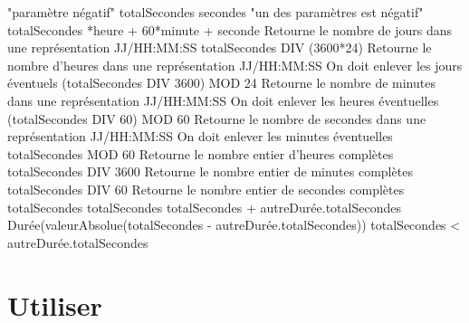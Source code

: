 		\begin{LDA}
					\Stmt {} "paramètre négatif"
				\EndIf
				\Let totalSecondes \Gets secondes
			\EndConstr
		\Empty
					\Stmt {} "un des paramètres est négatif"
				\EndIf
				\Let totalSecondes *heure + 60*minute + seconde
			\EndConstr
		\Empty
			\LComment Retourne le nombre de jours dans une 
			représentation JJ/HH:MM:SS
				\Return totalSecondes DIV (3600*24)
			\EndMethod
		\Empty
			\LComment Retourne le nombre d'heures dans une 
			représentation JJ/HH:MM:SS
				\LComment On doit enlever les jours éventuels
				\Return (totalSecondes DIV 3600) MOD 24
			\EndMethod
		\Empty
			\LComment Retourne le nombre de minutes dans une 
			représentation JJ/HH:MM:SS
				\LComment On doit enlever les heures éventuelles
				\Return (totalSecondes DIV 60) MOD 60
			\EndMethod
		\Empty
			\LComment Retourne le nombre de secondes dans une 
			représentation JJ/HH:MM:SS
				\LComment On doit enlever les minutes éventuelles
				\Return totalSecondes  MOD 60
			\EndMethod
		\Empty
			\LComment Retourne le nombre entier d’heures complètes
				\Return totalSecondes DIV 3600
			\EndMethod
		\Empty
			\LComment Retourne le nombre entier de minutes complètes
				\Return totalSecondes DIV 60
			\EndMethod
		\Empty
			\LComment Retourne le nombre entier de secondes complètes
				\Return totalSecondes
			\EndMethod
		\Empty
				\Let totalSecondes \Gets totalSecondes + autreDurée.totalSecondes
			\EndMethod
		\Empty
				\Return {} Durée(valeurAbsolue(totalSecondes - autreDurée.totalSecondes))
			\EndMethod
		\Empty
				\Return totalSecondes < autreDurée.totalSecondes
			\EndMethod
		\end{LDA}

\section{Utiliser}


